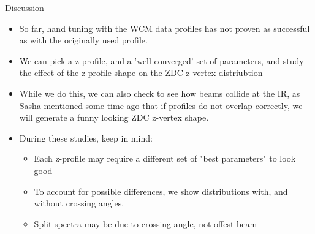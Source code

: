 \begin{frame}{Discussion}
	\begin{itemize}
		\item So far, hand tuning with the WCM data profiles has not proven as
			successful as with the originally used profile.
		\item We can pick a z-profile, and a 'well converged' set of parameters, and
			study the effect of the z-profile shape on the ZDC z-vertex distriubtion
		\item While we do this, we can also check to see how beams collide at the
			IR, as Sasha mentioned some time ago that if profiles do not overlap
			correctly, we will generate a funny looking ZDC z-vertex shape.
		\item During these studies, keep in mind:
			\begin{itemize}
					\item Each z-profile may require a different set of "best parameters"
						to look good
					\item To account for possible differences, we show distributions with,
						and without crossing angles.
					\item Split spectra may be due to crossing angle, not offest beam
			\end{itemize}
	\end{itemize}
\end{frame}
